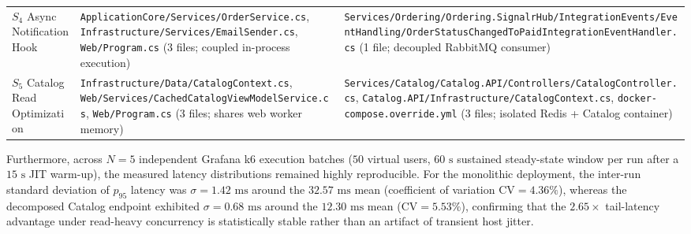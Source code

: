 \begin{table}[htbp]
\begin{tabularx}{\linewidth}{>{\raggedright\arraybackslash}p{1.85cm} >{\raggedright\arraybackslash}X >{\raggedright\arraybackslash}X}
\addlinespace
$S_4$ Async Notification Hook &
\texttt{ApplicationCore/\allowbreak Services/\allowbreak OrderService.cs}, \texttt{Infrastructure/\allowbreak Services/\allowbreak EmailSender.cs}, \texttt{Web/\allowbreak Program.cs} (3 files; coupled in-process execution) &
\texttt{Services/\allowbreak Ordering/\allowbreak Ordering.SignalrHub/\allowbreak IntegrationEvents/\allowbreak EventHandling/\allowbreak OrderStatusChangedToPaidIntegrationEventHandler.cs} (1 file; decoupled RabbitMQ consumer) \\
\addlinespace
$S_5$ Catalog Read Optimization &
\texttt{Infrastructure/\allowbreak Data/\allowbreak CatalogContext.cs}, \texttt{Web/\allowbreak Services/\allowbreak CachedCatalogViewModelService.cs}, \texttt{Web/\allowbreak Program.cs} (3 files; shares web worker memory) &
\texttt{Services/\allowbreak Catalog/\allowbreak Catalog.API/\allowbreak Controllers/\allowbreak CatalogController.cs}, \texttt{Catalog.API/\allowbreak Infrastructure/\allowbreak CatalogContext.cs}, \texttt{docker-compose.override.yml} (3 files; isolated Redis + Catalog container) \\
\bottomrule
\end{tabularx}
\end{table}

Furthermore, across $N = 5$ independent Grafana k6 execution batches ($50$ virtual users, $60\text{ s}$ sustained steady-state window per run after a $15\text{ s}$ JIT warm-up), the measured latency distributions remained highly reproducible. For the monolithic deployment, the inter-run standard deviation of $p_{95}$ latency was $\sigma = 1.42\text{ ms}$ around the $32.57\text{ ms}$ mean (coefficient of variation $\text{CV} = 4.36\%$), whereas the decomposed Catalog endpoint exhibited $\sigma = 0.68\text{ ms}$ around the $12.30\text{ ms}$ mean ($\text{CV} = 5.53\%$), confirming that the $2.65\times$ tail-latency advantage under read-heavy concurrency is statistically stable rather than an artifact of transient host jitter.
